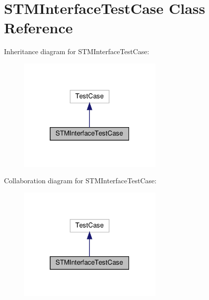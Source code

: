 \hypertarget{classstm__tools_1_1tests_1_1stmdevice__test_1_1STMInterfaceTestCase}{}\section{S\+T\+M\+Interface\+Test\+Case Class Reference}
\label{classstm__tools_1_1tests_1_1stmdevice__test_1_1STMInterfaceTestCase}


Inheritance diagram for S\+T\+M\+Interface\+Test\+Case\+:
\nopagebreak
\begin{figure}[H]
\begin{center}
\leavevmode
\includegraphics[width=199pt]{classstm__tools_1_1tests_1_1stmdevice__test_1_1STMInterfaceTestCase__inherit__graph}
\end{center}
\end{figure}


Collaboration diagram for S\+T\+M\+Interface\+Test\+Case\+:
\nopagebreak
\begin{figure}[H]
\begin{center}
\leavevmode
\includegraphics[width=199pt]{classstm__tools_1_1tests_1_1stmdevice__test_1_1STMInterfaceTestCase__coll__graph}
\end{center}
\end{figure}
